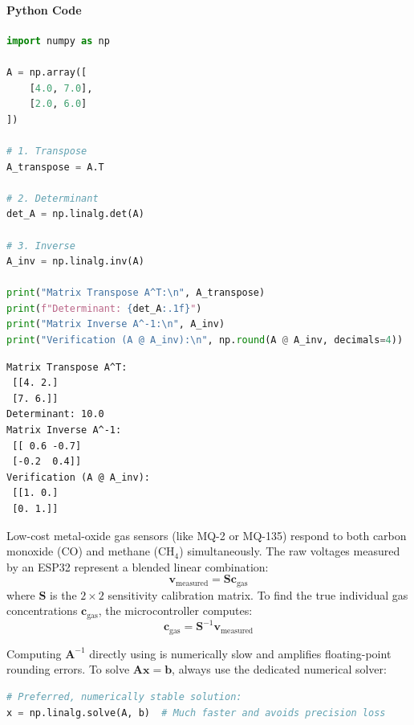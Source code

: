 \paragraph{Python Code}
\begin{lstlisting}[language=Python]
import numpy as np

A = np.array([
    [4.0, 7.0],
    [2.0, 6.0]
])

# 1. Transpose
A_transpose = A.T

# 2. Determinant
det_A = np.linalg.det(A)

# 3. Inverse
A_inv = np.linalg.inv(A)

print("Matrix Transpose A^T:\n", A_transpose)
print(f"Determinant: {det_A:.1f}")
print("Matrix Inverse A^-1:\n", A_inv)
print("Verification (A @ A_inv):\n", np.round(A @ A_inv, decimals=4))
\end{lstlisting}

\begin{lstlisting}[style=outputstyle]
Matrix Transpose A^T:
 [[4. 2.]
 [7. 6.]]
Determinant: 10.0
Matrix Inverse A^-1:
 [[ 0.6 -0.7]
 [-0.2  0.4]]
Verification (A @ A_inv):
 [[1. 0.]
 [0. 1.]]
\end{lstlisting}

\begin{iotbox}
Low-cost metal-oxide gas sensors (like MQ-2 or MQ-135) respond to both carbon monoxide (CO) and methane ($\text{CH}_4$) simultaneously. The raw voltages measured by an ESP32 represent a blended linear combination:
\begin{equation*}
\mathbf{v}_{\text{measured}} = \mathbf{S} \mathbf{c}_{\text{gas}}
\end{equation*}
where $\mathbf{S}$ is the $2 \times 2$ sensitivity calibration matrix. To find the true individual gas concentrations $\mathbf{c}_{\text{gas}}$, the microcontroller computes:
\begin{equation*}
\mathbf{c}_{\text{gas}} = \mathbf{S}^{-1} \mathbf{v}_{\text{measured}}
\end{equation*}
\end{iotbox}

\begin{warning}
Computing $\mathbf{A}^{-1}$ directly using  is numerically slow and amplifies floating-point rounding errors. To solve $\mathbf{A}\mathbf{x} = \mathbf{b}$, always use the dedicated numerical solver:
\begin{lstlisting}[language=Python]
# Preferred, numerically stable solution:
x = np.linalg.solve(A, b)  # Much faster and avoids precision loss
\end{lstlisting}
\end{warning}

